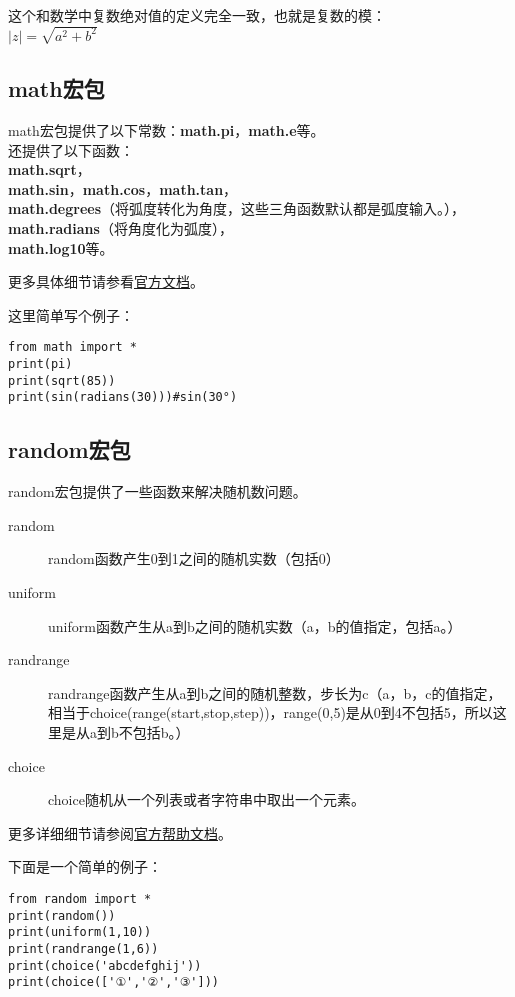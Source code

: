 \documentclass[12pt,oneside]{book}
\begin{document}
\begin{common-format}
这个和数学中复数绝对值的定义完全一致，也就是复数的模：\\
$ \left| z \right| =\sqrt { a^{ 2 }+b^{ 2 } }  $

\subsection{math宏包}
math宏包提供了以下常数：\textbf{math.pi}，\textbf{math.e}等。\\
还提供了以下函数：\\
\textbf{math.sqrt}，\\
\textbf{math.sin}，\textbf{math.cos}，\textbf{math.tan}，\\
\textbf{math.degrees}（将弧度转化为角度，这些三角函数默认都是弧度输入。），\\
\textbf{math.radians}（将角度化为弧度），\\
\textbf{math.log10}等。

更多具体细节请参看\href{http://docs.python.org/3.4/library/math.html}{官方文档}。

这里简单写个例子：
\begin{Verbatim}
from math import *
print(pi)
print(sqrt(85))
print(sin(radians(30)))#sin(30°)
\end{Verbatim}


\subsection{random宏包}
random宏包提供了一些函数来解决随机数问题。
\begin{description}
\item[random] random函数产生0到1之间的随机实数（包括0）
\item[uniform] uniform函数产生从a到b之间的随机实数（a，b的值指定，包括a。）
\item[randrange] randrange函数产生从a到b之间的随机整数，步长为c（a，b，c的值指定，相当于choice(range(start,stop,step))，range(0,5)是从0到4不包括5，所以这里是从a到b不包括b。）
\item[choice] choice随机从一个列表或者字符串中取出一个元素。
\end{description}

更多详细细节请参阅\href{http://docs.python.org/3.4/library/random.html}{官方帮助文档}。

下面是一个简单的例子：
\begin{Verbatim}
from random import *
print(random())
print(uniform(1,10))
print(randrange(1,6))
print(choice('abcdefghij'))
print(choice(['①','②','③']))
\end{Verbatim}








\end{common-format}
\end{document}
